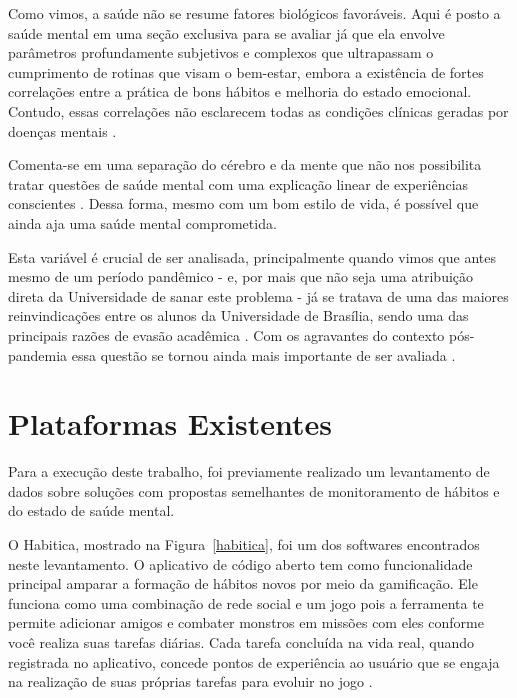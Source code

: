 Como vimos, a saúde não se resume fatores biológicos favoráveis. Aqui é posto a saúde mental em uma seção exclusiva para se avaliar já que ela envolve parâmetros profundamente subjetivos e complexos que ultrapassam o cumprimento de rotinas que visam o bem-estar, embora a existência de fortes correlações entre a prática de bons hábitos e melhoria do estado emocional. Contudo, essas correlações não esclarecem todas as condições clínicas geradas por doenças mentais \cite{quartilho2010saude}.

Comenta-se em uma separação do cérebro e da mente que não nos possibilita tratar questões de saúde mental com uma explicação linear de experiências conscientes \cite{quartilho2010saude}. Dessa forma, mesmo com um bom estilo de vida, é possível que ainda aja uma saúde mental comprometida.

Esta variável é crucial de ser analisada, principalmente quando vimos que antes mesmo de um período pandêmico - e, por mais que não seja uma atribuição direta da Universidade de sanar este problema - já se tratava de uma das maiores reinvindicações entre os alunos da Universidade de Brasília, sendo uma das principais razões de evasão acadêmica \cite{oliveira2020acesso}. Com os agravantes do contexto pós-pandemia essa questão se tornou ainda mais importante de ser avaliada \cite{da2025saude}.






\section{Plataformas Existentes}

Para a execução deste trabalho, foi previamente realizado um levantamento de dados sobre soluções com propostas semelhantes de monitoramento de hábitos e do estado de saúde mental. 

O Habitica, mostrado na Figura~\ref{habitica}, foi um dos softwares encontrados neste levantamento. O aplicativo de código aberto tem como funcionalidade principal amparar a formação de hábitos novos por meio da gamificação. Ele funciona como uma combinação de rede social e um jogo pois a ferramenta te permite adicionar amigos e combater monstros em missões com eles conforme você realiza suas tarefas diárias. Cada tarefa concluída na vida real, quando registrada no aplicativo, concede pontos de experiência ao usuário que se engaja na realização de suas próprias tarefas para evoluir no jogo \cite{habitica}. 


